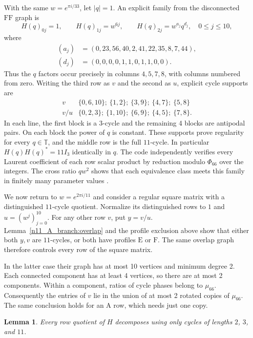 \documentclass[11pt,a4paper]{article}
\newtheorem{lemma}[theorem]{Lemma}
\theoremstyle{plain}
\theoremstyle{definition}
\theoremstyle{plain}
\begin{document}
\medskip
With the same $w=e^{\pi i/33}$, let $|q|=1$. An explicit family from the disconnected $\mathrm{FF}$ graph is
$$H(q)_{0j}=1,\qquad H(q)_{1j}=w^{6j},\qquad H(q)_{2j}=w^{a_j}q^{d_j},\quad 0\le j\le10,$$
where
\begin{align*}
(a_j)&=(0,23,56,40,2,41,22,35,8,7,44),\\
(d_j)&=(0,0,0,0,1,1,0,1,1,0,0).
\end{align*}
Thus the $q$ factors occur precisely in columns $4,5,7,8$, with columns numbered from zero. Writing the third row as $v$ and the second as $u$, explicit cycle supports are
$$\begin{array}{c|l}
v & \{0,6,10\};\ \{1,2\};\ \{3,9\};\ \{4,7\};\ \{5,8\}\\[2pt]
v/u & \{0,2,3\};\ \{1,10\};\ \{6,9\};\ \{4,5\};\ \{7,8\}.
\end{array}$$
In each line, the first block is a $3$-cycle and the remaining 4 blocks are antipodal pairs. On each block the power of $q$ is constant. These supports prove regularity for every $q\in\mathbb{T}$, and the middle row is the full $11$-cycle. In particular $H(q)H(q)^*=11I_3$ identically in $q$. The code independently verifies every Laurent coefficient of each row scalar product by reduction modulo $\Phi_{66}$ over the integers. The cross ratio $qw^{2}$ shows that each equivalence class meets this family in finitely many parameter values \cite{ha1,tz1}.

\medskip
We now return to $w=e^{2\pi i/11}$ and consider a regular square matrix with a distinguished $11$-cycle quotient. Normalize its distinguished rows to $1$ and $u=(w^{j})_{j=0}^{10}$. For any other row $v$, put $y=v/u$. Lemma~\ref{n11_A_branch:overlap} and the profile exclusion above show that either both $y,v$ are $11$-cycles, or both have profiles $\mathrm{E}$ or $\mathrm{F}$. The same overlap graph therefore controls every row of the square matrix.

In the latter case their graph has at most 10 vertices and minimum degree 2. Each connected component has at least 4 vertices, so there are at most 2 components. Within a component, ratios of cycle phases belong to $\mu_{66}$. Consequently the entries of $v$ lie in the union of at most 2 rotated copies of $\mu_{66}$. The same conclusion holds for an $\mathrm{A}$ row, which needs just one copy.

\par\addvspace{\medskipamount}\noindent
\begin{minipage}{\linewidth}
\begin{lemma}\label{n11_A_completion:smallprimes}
Every row quotient of $H$ decomposes using only cycles of lengths $2$, $3$, and $11$.
\end{lemma}
\end{minipage}
\par\addvspace{\medskipamount}
\end{document}
